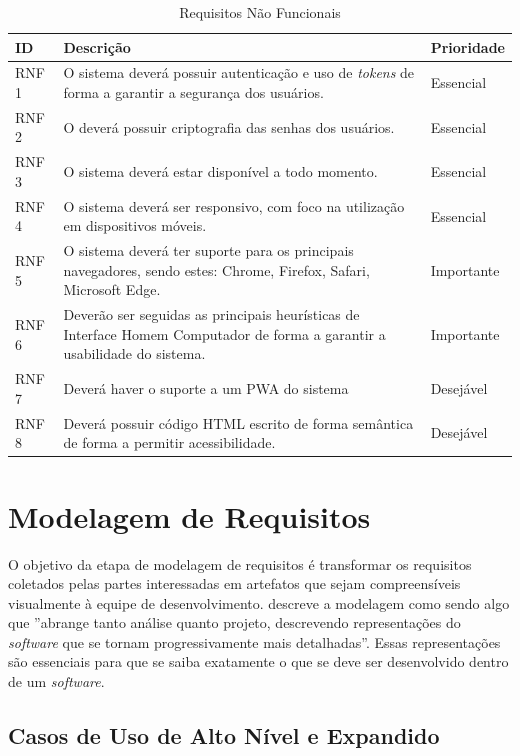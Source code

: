 \begin{table}[H]
\centering
\caption{Requisitos Não Funcionais}
\label{table:RequisitosNaoFuncionais}
\begin{tabular}{|C{1.2cm}|C{11.2cm}|C{2.2cm}|}
\hline
\textbf{ID} & \textbf{Descrição} & \textbf{Prioridade} \\
\hline
RNF 1 & O sistema deverá possuir autenticação e uso de \textit{tokens} de forma a garantir a segurança dos usuários. & Essencial \\ \hline
RNF 2 & O deverá possuir criptografia das senhas dos usuários. & Essencial \\ \hline
RNF 3 & O sistema deverá estar disponível a todo momento. & Essencial \\ \hline
RNF 4 & O sistema deverá ser responsivo, com foco na utilização em dispositivos móveis. & Essencial \\ \hline
RNF 5 & O sistema deverá ter suporte para os principais navegadores, sendo estes: Chrome, Firefox, Safari, Microsoft Edge. & Importante \\ \hline
RNF 6 & Deverão ser seguidas as principais heurísticas de Interface Homem Computador de forma a garantir a usabilidade do sistema. & Importante \\ \hline
RNF 7 & Deverá haver o suporte a um PWA do sistema & Desejável \\ \hline
RNF 8 & Deverá possuir código HTML escrito de forma semântica de forma a permitir acessibilidade. & Desejável \\ \hline

\end{tabular}
\end{table}

\section{Modelagem de Requisitos}
\label{sec:modelagemDeRequisitos}

O objetivo da etapa de modelagem de requisitos é transformar os requisitos coletados pelas partes interessadas em artefatos que sejam compreensíveis visualmente à equipe de desenvolvimento. \cite{pressman2009engenharia} descreve a modelagem como sendo algo que ”abrange tanto análise quanto projeto, descrevendo representações do \textit{software} que se tornam progressivamente mais detalhadas”. Essas representações são essenciais para que se saiba exatamente o que se deve ser desenvolvido dentro de um \textit{software}.

\subsection{Casos de Uso de Alto Nível e Expandido}

